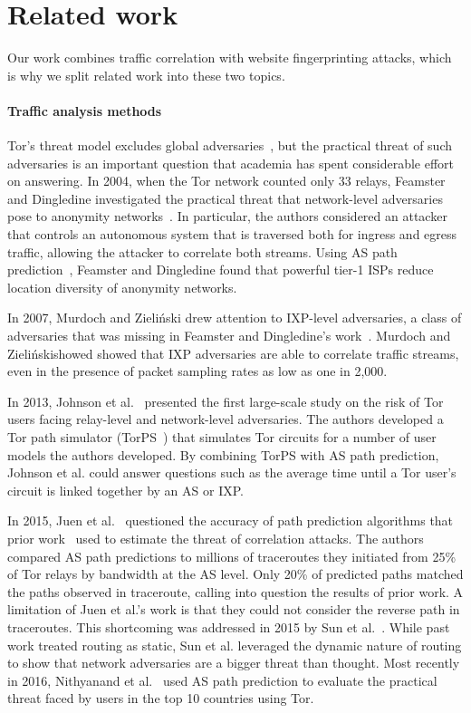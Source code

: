 \section{Related work}
\label{sec:related_work}
Our work combines traffic correlation with website fingerprinting attacks,
which is why we split related work into these two topics.

\paragraph{Traffic analysis methods}
Tor's threat model excludes global adversaries~\cite{Dingledine2004a}, but the
practical threat of such adversaries is an important question that academia has
spent considerable effort on answering.  In 2004, when the Tor network counted
only 33 relays, Feamster and Dingledine investigated the practical threat that
network-level adversaries pose to anonymity networks~\cite{Feamster2004a}.  In
particular, the authors considered an attacker that controls an autonomous
system that is traversed both for ingress and egress traffic, allowing the
attacker to correlate both streams.  Using AS path prediction~\cite{Gao2001a},
Feamster and Dingledine found that powerful tier-1 ISPs reduce location
diversity of anonymity networks.

In 2007, Murdoch and Zieli\'{n}ski drew attention to IXP-level adversaries, a
class of adversaries that was missing in Feamster and Dingledine's
work~\cite{Murdoch2007a}.  Murdoch and Zieli\'{n}skishowed showed that IXP
adversaries are able to correlate traffic streams, even in the presence of
packet sampling rates as low as one in 2,000.

In 2013, Johnson et al.~\cite{Johnson2013a} presented the first large-scale
study on the risk of Tor users facing relay-level and network-level
adversaries.  The authors developed a Tor path simulator (TorPS~\cite{TorPS})
that simulates Tor circuits for a number of user models the authors developed.
By combining TorPS with AS path prediction, Johnson et al. could answer
questions such as the average time until a Tor user's circuit is linked
together by an AS or IXP.

In 2015, Juen et al.~\cite{Juen2015a} questioned the accuracy of path
prediction algorithms that prior work~\cite{Johnson2013a,Feamster2004a} used to
estimate the threat of correlation attacks.  The authors compared AS path
predictions to millions of traceroutes they initiated from 25\% of Tor relays
by bandwidth at the AS level.  Only 20\% of predicted paths matched the paths
observed in traceroute, calling into question the results of prior work.  A
limitation of Juen et al.'s work is that they could not consider the reverse
path in traceroutes.  This shortcoming was addressed in 2015 by Sun et
al.~\cite{Sun2015a}.  While past work treated routing as static, Sun et al.
leveraged the dynamic nature of routing to show that network adversaries are a
bigger threat than thought.  Most recently in 2016, Nithyanand et
al.~\cite{Nithyanand2016a} used AS path prediction to evaluate the practical
threat faced by users in the top 10 countries using Tor.

